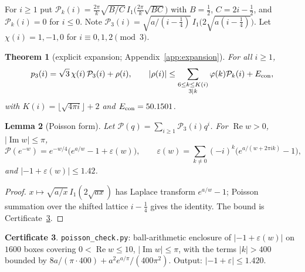 \documentclass[11pt,reqno]{amsart}
\theoremstyle{plain}
\newtheorem{theorem}{Theorem}[section]
\newtheorem{lemma}[theorem]{Lemma}
\theoremstyle{definition}
\newtheorem{certificate}[theorem]{Certificate}
\newcommand{\cP}{\mathcal P}
\renewcommand{\Re}{\operatorname{Re}}
\renewcommand{\Im}{\operatorname{Im}}
\begin{document}
For $i\ge1$ put $\cP_k(i)=\frac{2\pi}{k}\sqrt{B/C}\,I_1\big(\frac{2\pi}{k}\sqrt{BC}\big)$ with $B=\frac12$, $C=2i-\frac12$, and
$\cP_k(i)=0$ for $i\le0$. Note $\cP_3(i)=\sqrt{a/(i-\frac14)}\,I_1\big(2\sqrt{a(i-\frac14)}\big)$. Let $\chi(i)=1,-1,0$ for
$i\equiv0,1,2\pmod 3$.

\begin{theorem}[explicit expansion; Appendix~\ref{app:expansion}]\label{thm:expansion}
For all $i\ge1$,
\[
p_3(i)=\sqrt3\,\chi(i)\,\cP_3(i)+\rho(i),\qquad |\rho(i)|\le\sum_{\substack{6\le k\le K(i)\\3\mid k}}\varphi(k)\cP_k(i)+E_{\rm con},
\]
with $K(i)=\lfloor\sqrt{4\pi i}\rfloor+2$ and $E_{\rm con}=50.1501$.
\end{theorem}

\begin{lemma}[Poisson form]\label{lem:poisson}
Let $\cP(q)=\sum_{i\ge1}\cP_3(i)q^i$. For $\Re w>0$, $|\Im w|\le\pi$,
\[
\cP(e^{-w})=e^{-w/4}\big(e^{a/w}-1+\varepsilon(w)\big),\qquad \varepsilon(w)=\sum_{k\ne0}(-i)^k\big(e^{a/(w+2\pi ik)}-1\big),
\]
and $|{-1}+\varepsilon(w)|\le 1.42$.
\end{lemma}
\begin{proof}
$x\mapsto\sqrt{a/x}\,I_1(2\sqrt{ax})$ has Laplace transform $e^{a/w}-1$; Poisson summation over the shifted lattice
$i-\frac14$ gives the identity. The bound is Certificate~\ref{cert:poisson}.
\end{proof}

\begin{certificate}\label{cert:poisson}
\texttt{poisson\_check.py}: ball-arithmetic enclosure of $|{-1}+\varepsilon(w)|$ on $1600$ boxes covering
$0<\Re w\le10$, $|\Im w|\le\pi$, with the terms $|k|>400$ bounded by $8a/(\pi\cdot400)+a^2e^{a/\pi}/(400\pi^2)$.
Output: $|{-1}+\varepsilon|\le1.420$.
\end{certificate}
\end{document}

